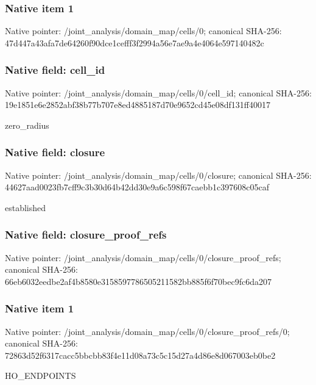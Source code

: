 \documentclass[10pt,a4paper]{article}
\begin{document}
\subsubsection{Native item 1}
Native pointer: /joint\_\allowbreak{}analysis/domain\_\allowbreak{}map/cells/0; canonical SHA-256: 47d447a43afa7de64260f90dce1cefff3f2994a56e7ae9a4e4064e597140482c

\subsubsection{Native field: cell\_\allowbreak{}id}
Native pointer: /joint\_\allowbreak{}analysis/domain\_\allowbreak{}map/cells/0/cell\_\allowbreak{}id; canonical SHA-256: 19e1851e6e2852abf38b77b707e8ed4885187d70e9652cd45e08df131ff40017

\begingroup\raggedright\sloppy zero\_\allowbreak{}radius\par\endgroup

\subsubsection{Native field: closure}
Native pointer: /joint\_\allowbreak{}analysis/domain\_\allowbreak{}map/cells/0/closure; canonical SHA-256: 44627aad0023fb7cff9c3b30d64b42dd30e9a6c598f67caebb1c397608c05caf

\begingroup\raggedright\sloppy established\par\endgroup

\subsubsection{Native field: closure\_\allowbreak{}proof\_\allowbreak{}refs}
Native pointer: /joint\_\allowbreak{}analysis/domain\_\allowbreak{}map/cells/0/closure\_\allowbreak{}proof\_\allowbreak{}refs; canonical SHA-256: 66eb6032eedbe2af4b8580e3158597786505211582bb885f6f70bec9fc6da207

\subsubsection{Native item 1}
Native pointer: /joint\_\allowbreak{}analysis/domain\_\allowbreak{}map/cells/0/closure\_\allowbreak{}proof\_\allowbreak{}refs/0; canonical SHA-256: 72863d52f6317cacc5bbcbb83f4e11d08a73c5c15d27a4d86e8d067003eb0be2

\begingroup\raggedright\sloppy HO\_\allowbreak{}ENDPOINTS\par\endgroup
\end{document}
